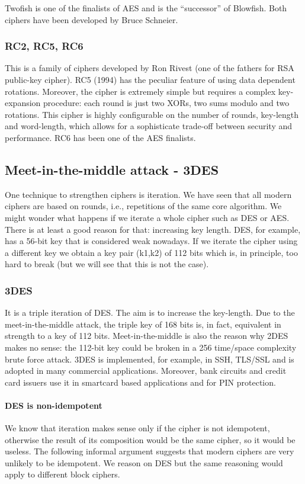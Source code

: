 Twofish is one of the finalists of AES and is the “successor” of Blowfish. Both ciphers have been developed by Bruce Schneier.

\subsubsection{RC2, RC5, RC6}
This is a family of ciphers developed by Ron Rivest (one of the fathers for RSA public-key cipher). RC5 (1994) has the peculiar feature of using data dependent rotations. Moreover, the cipher is extremely simple but requires a complex key-expansion procedure: each round is just two XORs, two sums modulo and two rotations. This cipher is highly configurable on the number of rounds, key-length and word-length, which allows for a sophisticate trade-off between security and performance.
RC6 has been one of the AES finalists.

\subsection{Meet-in-the-middle attack - 3DES}
One technique to strengthen ciphers is iteration. We have seen that all modern ciphers are based on rounds, i.e., repetitions of the same core algorithm. We might wonder what happens if we iterate a whole cipher such as DES or AES. There is at least a good reason for that: increasing key length. DES, for example, has a 56-bit key that is considered weak nowadays. If we iterate the cipher using a different key we obtain a key pair (k1,k2) of 112 bits which is, in principle, too hard to break (but we will see that this is not the case).

\subsubsection{3DES}
It is a triple iteration of DES. The aim is to increase the key-length. Due to the meet-in-the-middle attack, the triple key of 168 bits is, in fact, equivalent in strength to a key of 112 bits. Meet-in-the-middle is also the reason why 2DES makes no sense: the 112-bit key could be broken in a 256  time/space complexity brute force attack. 3DES is implemented, for example, in SSH, TLS/SSL and is adopted in many commercial applications. Moreover, bank circuits and credit card issuers use it in smartcard based applications and for PIN protection.

\paragraph{DES is non-idempotent}
We know that iteration makes sense only if the cipher is not idempotent, otherwise the result of its composition would be the same cipher, so it would be useless. The following informal argument suggests that modern ciphers are very unlikely to be idempotent. We reason on DES but the same reasoning would apply to different block ciphers.

